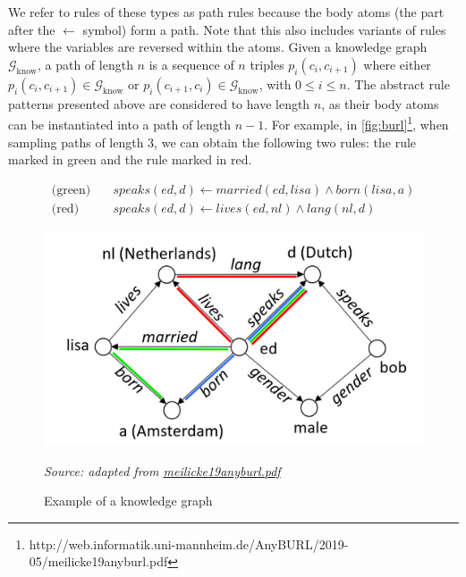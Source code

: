 

We refer to rules of these types as path rules because the body atoms (the part after the \(\gets\) symbol) form a path. Note that this also includes variants of rules where the variables are reversed within the atoms. Given a knowledge graph \(\mathcal{G}_{\text{know}}\), a path of length \(n\) is a sequence of \(n\) triples \(p_i(c_i, c_{i+1})\) where either \(p_i(c_i, c_{i+1}) \in \mathcal{G}_{\text{know}}\) or \(p_i(c_{i+1}, c_i) \in \mathcal{G}_{\text{know}}\), with \(0 \leq i \leq n\). The abstract rule patterns presented above are considered to have length \(n\), as their body atoms can be instantiated into a path of length \(n - 1\). For example, in \autoref{fig:burl}\footnote{http://web.informatik.uni-mannheim.de/AnyBURL/2019-05/meilicke19anyburl.pdf},  
when sampling paths of length 3, we can obtain the following two rules: the rule marked in green and the rule marked in red.

\begin{equation*}
	\begin{aligned}
		\text{(green)} \quad & speaks(ed, d) \gets married(ed, lisa) \wedge born(lisa, a) \\
		\text{(red)} \quad & speaks(ed, d) \gets lives(ed, nl) \wedge lang(nl, d)
	\end{aligned}
\end{equation*}

\begin{figure}[htp]
	\centering
	\includegraphics[width=12cm]{images/burl-ago.png}
	\caption{Example of a knowledge graph} 
	\textit{Source: adapted from \href{http://web.informatik.uni-mannheim.de/AnyBURL/2019-05/meilicke19anyburl.pdf}{meilicke19anyburl.pdf}}
	\label{fig:burl}
\end{figure}


